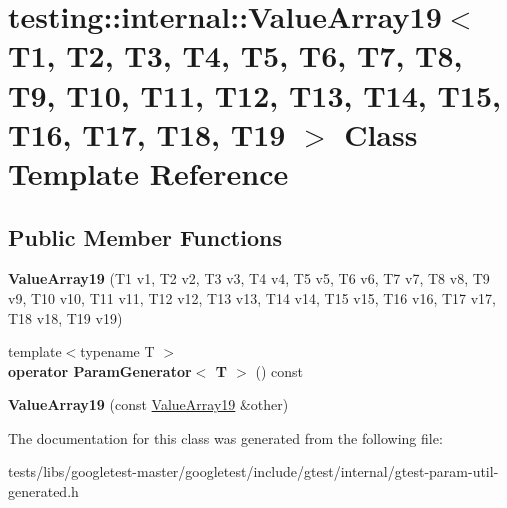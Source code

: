 \hypertarget{classtesting_1_1internal_1_1ValueArray19}{}\section{testing\+:\+:internal\+:\+:Value\+Array19$<$ T1, T2, T3, T4, T5, T6, T7, T8, T9, T10, T11, T12, T13, T14, T15, T16, T17, T18, T19 $>$ Class Template Reference}
\label{classtesting_1_1internal_1_1ValueArray19}
\subsection*{Public Member Functions}
\begin{DoxyCompactItemize}
\item 
\mbox{\label{classtesting_1_1internal_1_1ValueArray19_a1ffcdacd1ffb1d6718187a66458c09e2}} 
{\bfseries Value\+Array19} (T1 v1, T2 v2, T3 v3, T4 v4, T5 v5, T6 v6, T7 v7, T8 v8, T9 v9, T10 v10, T11 v11, T12 v12, T13 v13, T14 v14, T15 v15, T16 v16, T17 v17, T18 v18, T19 v19)
\item 
\mbox{\label{classtesting_1_1internal_1_1ValueArray19_a8ddd6c1de46e25310cf844895c7c8cf6}} 
{\footnotesize template$<$typename T $>$ }\\{\bfseries operator Param\+Generator$<$ T $>$} () const
\item 
\mbox{\label{classtesting_1_1internal_1_1ValueArray19_a1029ebc5d39633e2fb278e051d0ec1d0}} 
{\bfseries Value\+Array19} (const \hyperlink{classtesting_1_1internal_1_1ValueArray19}{Value\+Array19} \&other)
\end{DoxyCompactItemize}


The documentation for this class was generated from the following file\+:\begin{DoxyCompactItemize}
\item 
tests/libs/googletest-\/master/googletest/include/gtest/internal/gtest-\/param-\/util-\/generated.\+h\end{DoxyCompactItemize}
